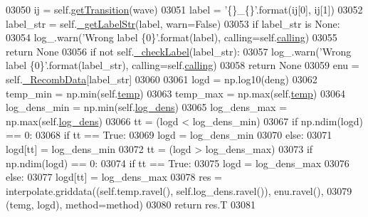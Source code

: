 \begin{DoxyCode}
03050                 ij = self.\hyperlink{classpyneb_1_1core_1_1pynebcore_1_1_rec_atom_abc77497db8e5d888d8424e4a82d50c2e}{getTransition}(wave)
03051                 label = \textcolor{stringliteral}{'\{\}\_\{\}'}.format(ij[0], ij[1])
03052         label\_str = self.\hyperlink{classpyneb_1_1core_1_1pynebcore_1_1_rec_atom_afecb53ee6cdd96699b3b9250fbcc957e}{\_getLabelStr}(label, warn=\textcolor{keyword}{False})
03053         \textcolor{keywordflow}{if} label\_str \textcolor{keywordflow}{is} \textcolor{keywordtype}{None}:
03054             log\_.warn(\textcolor{stringliteral}{'Wrong label \{0\}'}.format(label), calling=self.\hyperlink{classpyneb_1_1core_1_1pynebcore_1_1_rec_atom_a82ec425ebba32b73a5d9ae52717d47c4}{calling})
03055             \textcolor{keywordflow}{return} \textcolor{keywordtype}{None}
03056         \textcolor{keywordflow}{if} \textcolor{keywordflow}{not} self.\hyperlink{classpyneb_1_1core_1_1pynebcore_1_1_rec_atom_ae43d7773b11884138df2cf89cd483708}{\_checkLabel}(label\_str):
03057             log\_.warn(\textcolor{stringliteral}{'Wrong label \{0\}'}.format(label\_str), calling=self.\hyperlink{classpyneb_1_1core_1_1pynebcore_1_1_rec_atom_a82ec425ebba32b73a5d9ae52717d47c4}{calling})
03058             \textcolor{keywordflow}{return} \textcolor{keywordtype}{None}
03059         enu = self.\hyperlink{classpyneb_1_1core_1_1pynebcore_1_1_rec_atom_a1f483d9d99af479ef137489ccefe35e9}{\_RecombData}[label\_str]
03060             
03061         logd = np.log10(deng)
03062         temp\_min = np.min(self.\hyperlink{classpyneb_1_1core_1_1pynebcore_1_1_rec_atom_afdcfb955b81391dabcb298fe4990e33c}{temp})
03063         temp\_max = np.max(self.\hyperlink{classpyneb_1_1core_1_1pynebcore_1_1_rec_atom_afdcfb955b81391dabcb298fe4990e33c}{temp})
03064         log\_dens\_min = np.min(self.\hyperlink{classpyneb_1_1core_1_1pynebcore_1_1_rec_atom_ac93e76934d279878d4f1f6d961df5488}{log\_dens})
03065         log\_dens\_max = np.max(self.\hyperlink{classpyneb_1_1core_1_1pynebcore_1_1_rec_atom_ac93e76934d279878d4f1f6d961df5488}{log\_dens})
03066         tt = (logd < log\_dens\_min)
03067         \textcolor{keywordflow}{if} np.ndim(logd) == 0: 
03068             \textcolor{keywordflow}{if} tt == \textcolor{keyword}{True}:
03069                 logd = log\_dens\_min
03070         \textcolor{keywordflow}{else}:
03071             logd[tt] = log\_dens\_min
03072         tt = (logd > log\_dens\_max)
03073         \textcolor{keywordflow}{if} np.ndim(logd) == 0:
03074             \textcolor{keywordflow}{if} tt == \textcolor{keyword}{True}:
03075                 logd = log\_dens\_max
03076         \textcolor{keywordflow}{else}:
03077             logd[tt] = log\_dens\_max
03078         res = interpolate.griddata((self.temp.ravel(), self.log\_dens.ravel()), enu.ravel(),
03079                                    (temg, logd), method=method)
03080         \textcolor{keywordflow}{return} res.T
03081 

\end{DoxyCode}
